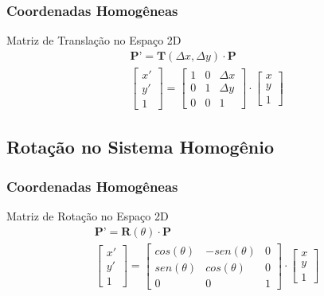 \documentclass{beamer}
\begin{document}

\begin{frame}
\frametitle{Coordenadas Homogêneas}
	\begin{block}{Matriz de Translação no Espaço 2D}
		\begin{eqnarray*}
			\textbf{P'} = \textbf{T}(\Delta x, \Delta y) \cdot \textbf{P} \\
			\begin{bmatrix} 
					x' \\
					y' \\
					1
			\end{bmatrix}
			=	\begin{bmatrix}
					1	& 0 	& \Delta x \\
					0 	& 1	& \Delta y \\
					0	& 0	& 1
					\end{bmatrix}
			\cdot \begin{bmatrix}
					x \\
					y \\
					1
				\end{bmatrix}
		\end{eqnarray*}
	\end{block}


\end{frame}


\subsection{Rotação no Sistema Homogênio}
\begin{frame}
\frametitle{Coordenadas Homogêneas}
	\begin{block}{Matriz de Rotação no Espaço 2D}
		\begin{eqnarray*}
			\textbf{P'} = \textbf{R}(\theta) \cdot \textbf{P} \\
			\begin{bmatrix} 
					x' \\
					y' \\
					1
			\end{bmatrix}
			=	\begin{bmatrix}
					cos(\theta)	& -sen (\theta) 	& 0 \\
					sen(\theta)	& cos (\theta) 	& 0 \\
					0	& 0	& 1
					\end{bmatrix}
			\cdot \begin{bmatrix}
					x \\
					y \\
					1
				\end{bmatrix}
		\end{eqnarray*}
	\end{block}


\end{frame}
\end{document}

